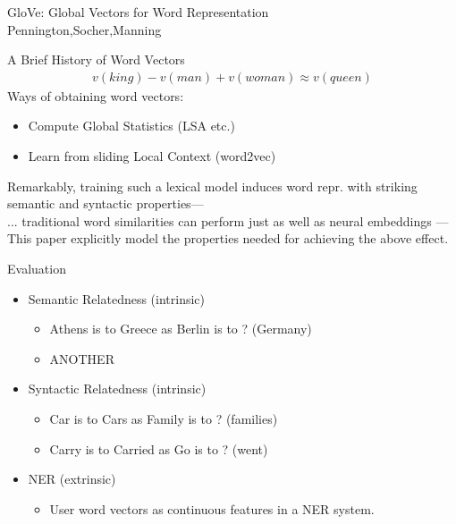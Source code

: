 \begin{frame}
  \begin{center}
    {\huge GloVe: Global Vectors for Word Representation
    } \\
    Pennington,Socher,Manning
  \end{center}
\end{frame}

\begin{frame}{A Brief History of Word Vectors}
  \begin{align*}
    v(king) - v(man) + v(woman) \approx v(queen)
  \end{align*}
  Ways of obtaining word vectors:
  \begin{itemize}
  \item Compute Global Statistics (LSA etc.)
  \item Learn from sliding Local Context (word2vec)
  \end{itemize}
  {\footnotesize Remarkably, training such a lexical model induces word repr. with striking semantic and syntactic properties---\cite{Mikolov13a}} \\
  {\footnotesize ... traditional word similarities can perform just as well as neural embeddings ---\cite{Levy14}} \\
  This paper explicitly model the properties needed for achieving the above effect.
\end{frame}

\begin{frame}{Evaluation}
  \begin{itemize}
  \item Semantic Relatedness (intrinsic)
    \begin{itemize}
    \item Athens is to Greece as Berlin is to ? (Germany)
    \item ANOTHER
    \end{itemize}
  \item Syntactic Relatedness (intrinsic)
    \begin{itemize}
    \item Car is to Cars as Family is to ? (families)
    \item Carry is to Carried as Go is to ? (went)
    \end{itemize}
  \item NER (extrinsic)
    \begin{itemize}
    \item User word vectors as continuous features in a NER system.
    \end{itemize}
  \end{itemize}
\end{frame}

